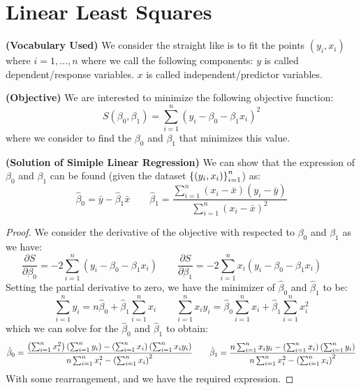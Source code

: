 \section{Linear Least Squares}

\begin{remark}{\textbf{(Vocabulary Used)}}
    We consider the straight like is to fit the points $(y_i, x_i)$ where $i=1,\dots,n$ where we call the following components: $y$ is called dependent/response variables. $x$ is called independent/predictor variables.
\end{remark}

\begin{definition}{\textbf{(Objective)}}
    We are interested to minimize the following objective function:
    \begin{equation*}
        S(\beta_0, \beta_1) = \sum^n_{i=1}(y_i - \beta_0 - \beta_1x_i)^2
    \end{equation*}
    where we consider to find the $\beta_0$ and $\beta_1$ that minimizes this value. 
\end{definition}

\begin{proposition}{\textbf{(Solution of Simiple Linear Regression)}}
    We can show that the expression of $\beta_0$ and $\beta_1$ can be found (given the dataset $\left\{ (y_i, x_i) \right\}^n_{i=1}$)  as:
    \begin{equation*}
        \hat{\beta}_0 = \bar{y} - \hat{\beta}_1\bar{x} \qquad \hat{\beta}_1 = \frac{\sum^n_{i=1}(x_i - \bar{x})(y_i-\bar{y})}{\sum^n_{i=1}(x_i - \bar{x})^2}
    \end{equation*}
\end{proposition}
\begin{proof}
    We consider the derivative of the objective with respected to $\beta_0$ and $\beta_1$ as we have:
    \begin{equation*}
        \frac{\partial S}{\partial \beta_0} = -2\sum^n_{i=1}(y_i - \beta_0 - \beta_1x_i) \qquad
        \frac{\partial S}{\partial \beta_1} = -2\sum^n_{i=1}x_i(y_i - \beta_0 - \beta_1x_i) \qquad
    \end{equation*}
    Setting the partial derivative to zero, we have the minimizer of $\hat{\beta}_0$ and $\hat{\beta}_1$ to be:
    \begin{equation*}
        \sum^n_{i=1}y_i = n\hat{\beta}_0 + \hat{\beta}_1\sum^n_{i=1}x_i \qquad \sum^n_{i=1}x_iy_i = \hat{\beta}_0 \sum^n_{i=1}x_i + \hat{\beta}_1\sum^n_{i=1}x_i^2
    \end{equation*}
    which we can solve for the $\hat{\beta}_0$ and $\hat{\beta}_1$ to obtain:
    \begin{equation*}
        \hat{\beta}_0 = \frac{\left( \sum^n_{i=1}x_i^2 \right)\left( \sum^n_{i=1}y_i \right) - \left( \sum^n_{i=1} x_i \right)\left( \sum^n_{i=1}x_iy_i \right)}{n\sum^n_{i=1}x_i^2 - \left( \sum^n_{i=1}x_i \right)^2} \qquad \hat{\beta}_1 = \frac{n\sum^n_{i=1}x_iy_i - \left( \sum^n_{i=1}x_i \right)\left( \sum^n_{i=1}y_i \right)}{n\sum^n_{i=1}x_i^2 - \left( \sum^n_{i=1}x_i \right)^2}
    \end{equation*}
    With some rearrangement, and we have the required expression.
\end{proof}

